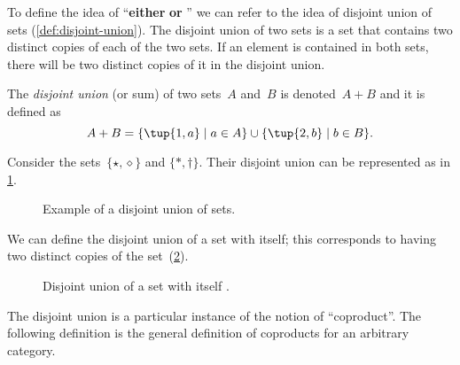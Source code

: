 To define the idea of ``\textbf{either}  \textbf{or} '' we can refer to the idea of disjoint union of sets (\cref{def:disjoint-union}). The disjoint union of two sets is a set that contains two distinct copies of each of the two sets. If an element is contained in both sets, there will be two distinct copies of it in the disjoint union.

\begin{definition}
\label{def:disjoint-union}
    The \emph{disjoint union} (or sum) of two sets~$A$ and~$B$ is denoted~$A + B$
    and it is defined as
    \begin{equation}
        A + B=\{\tup{1,a}\mid a\in A\}\cup\{\tup{2,b}\mid b\in B\}.
    \end{equation}
\end{definition}

\begin{example}
Consider the sets~$\{\star, \diamond\}$ and $\{\ast, \dagger\}$. Their disjoint union can be represented as in \cref{fig:disjoint}.
\begin{figure}[h!]
    \begin{center}
    \end{center}
    \caption{Example of a disjoint union of sets. \label{fig:disjoint}}
\end{figure}
\end{example}

We can define the disjoint union of a set with itself; this corresponds to having two distinct copies of the set~(\cref{fig:disjointself}).

\begin{figure}[h!]
\begin{center}
    \caption{Disjoint union of a set with itself \label{fig:disjointself}.}
\end{center}
\end{figure}

The disjoint union is a particular instance of the notion of ``coproduct''.
The following definition is the general definition of coproducts for an arbitrary category.
 
